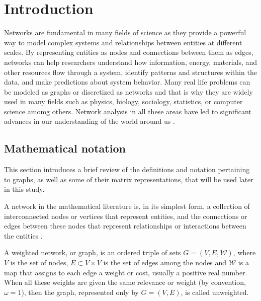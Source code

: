 
\chapter[Introduction]{Introduction}
\label{chap:intro}

Networks are fundamental in many fields of science as they provide a powerful way to model complex systems and relationships between entities at different scales. By representing entities as nodes and connections between them as edges, networks can help researchers understand how information, energy, materials, and other resources flow through a system, identify patterns and structures within the data, and make predictions about system behavior. Many real life problems can be modeled as graphs or discretized as networks and that is why they are widely used in many fields such as physics, biology, sociology, statistics, or computer science amomg others. Network analysis in all these areas have led to significant advances in our understanding of the world around us \cite{albert2002statistical, katz1953new, newman2018networks}.

\section{Mathematical notation}
\label{sec:graph}
This section introduces a brief review of the definitions and notation pertaining to graphs, as well as some of their matrix representations, that will be used later in this study.

A network in the mathematical literature is, in its simplest form, a collection of interconnected nodes or vertices that represent entities, and the connections or edges between these nodes that represent relationships or interactions between the entities \cite{arrigo2022dynamic}.

\begin{definition}
    A weighted network, or graph, is an ordered triple of sets $G = (V, E, \mathcal{W})$, where $V$ is the set of nodes, $E\subset V\times V$ is the set of edges among the nodes and $\mathcal{W}$ is a map that assigns to each edge a weight or cost, usually a positive real number. When all these weights are given the same relevance or weight (by convention, $\omega=1$), then the graph, represented only by $G = (V, E)$, is called unweighted.
\end{definition}


